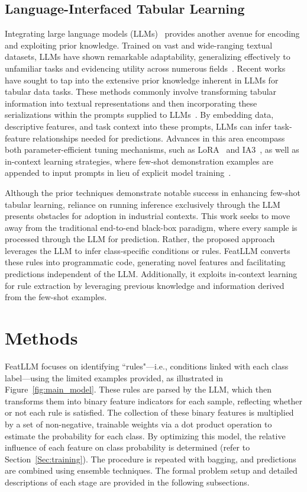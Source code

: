 \subsection{Language-Interfaced Tabular Learning} Integrating large language models (LLMs)~\cite{anil2023palm,openai2023gpt4} provides another avenue for encoding and exploiting prior knowledge. Trained on vast and wide-ranging textual datasets, LLMs have shown remarkable adaptability, generalizing effectively to unfamiliar tasks and evidencing utility across numerous fields~\cite{brown2020language}. Recent works have sought to tap into the extensive prior knowledge inherent in LLMs for tabular data tasks. These methods commonly involve transforming tabular information into textual representations and then incorporating these serializations within the prompts supplied to LLMs~\cite{dinh2022lift,hegselmann2023tabllm,wang2023anypredict}. By embedding data, descriptive features, and task context into these prompts, LLMs can infer task-feature relationships needed for predictions. Advances in this area encompass both parameter-efficient tuning mechanisms, such as LoRA~\cite{hu2021lora} and IA3~\cite{liu2022few}, as well as in-context learning strategies, where few-shot demonstration examples are appended to input prompts in lieu of explicit model training~\cite{dinh2022lift,hegselmann2023tabllm,nam2023semi,slack2023tablet}.

Although the prior techniques demonstrate notable success in enhancing few-shot tabular learning, reliance on running inference exclusively through the LLM presents obstacles for adoption in industrial contexts. This work seeks to move away from the traditional end-to-end black-box paradigm, where every sample is processed through the LLM for prediction. Rather, the proposed approach leverages the LLM to infer class-specific conditions or rules. \textsf{FeatLLM} converts these rules into programmatic code, generating novel features and facilitating predictions independent of the LLM. Additionally, it exploits in-context learning for rule extraction by leveraging previous knowledge and information derived from the few-shot examples.

\section{Methods}
\textsf{FeatLLM} focuses on identifying ``rules"—i.e., conditions linked with each class label—using the limited examples provided, as illustrated in Figure~\ref{fig:main_model}. These rules are parsed by the LLM, which then transforms them into binary feature indicators for each sample, reflecting whether or not each rule is satisfied. The collection of these binary features is multiplied by a set of non-negative, trainable weights via a dot product operation to estimate the probability for each class. By optimizing this model, the relative influence of each feature on class probability is determined (refer to Section~\ref{Sec:training}). The procedure is repeated with bagging, and predictions are combined using ensemble techniques. The formal problem setup and detailed descriptions of each stage are provided in the following subsections.


